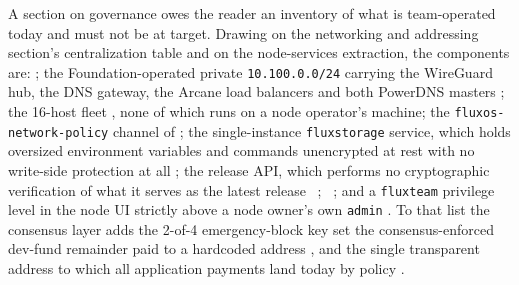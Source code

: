 A section on governance owes the reader an inventory of what is team-operated today and must not be
at target. Drawing on the networking and addressing section's centralization table and on the
node-services extraction, the components are: 
; the Foundation-operated
private \texttt{10.100.0.0/24} carrying the WireGuard hub, the DNS gateway, the Arcane load
balancers and both PowerDNS masters
; the 16-host \FDM{} fleet
,
none of which runs on a node operator's machine; the \texttt{fluxos-\allowbreak{}network-\allowbreak{}policy} channel of
; the single-instance \texttt{fluxstorage} service, which holds
oversized environment variables and commands unencrypted at rest with no write-side protection at
all ; the release API, which performs no cryptographic
verification of what it serves as the latest release \shipped~;  \shipped~;
and a
\texttt{fluxteam} privilege level in the node UI strictly above a node owner's own \texttt{admin}
. To that list the consensus
layer adds the 2-of-4 emergency-block key set   the
consensus-enforced dev-fund remainder paid to a hardcoded address
, and the single transparent address to which all
application payments land today by policy
.

